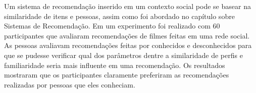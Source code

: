 Um sistema de recomendação inserido em um contexto social pode se basear na similaridade de itens e pessoas, assim como foi abordado no capítulo sobre Sistemas de Recomendação. Em \cite{bonhard2007devil} um experimento foi realizado com 60 participantes que avaliaram recomendações de filmes feitas em uma rede social. As pessoas avaliavam recomendações feitas por conhecidos e desconhecidos para que se pudesse verificar qual dos parâmetros dentre a similaridade de perfis e familiaridade seria mais influente em uma recomendação. Os resultados mostraram que os participantes claramente preferiram as recomendações realizadas por pessoas que eles conheciam.


